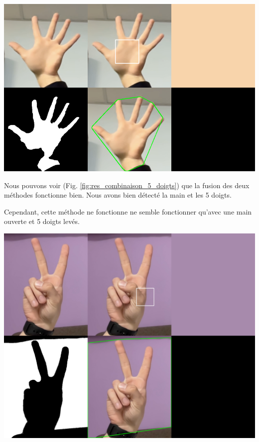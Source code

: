 \documentclass[11pt]{article}
\begin{document}
\begin{center}
    \includegraphics[width=\textwidth]{images/res_combinaison_5_doigts.png}
    \label{fig:res_combinaison_5_doigts}
\end{center}

Nous pouvons voir (Fig. \ref{fig:res_combinaison_5_doigts}) que la fusion des deux méthodes fonctionne bien. Nous avons bien détecté la main et les 5 doigts. \bigbreak

Cependant, cette méthode ne fonctionne ne semble fonctionner qu'avec une main ouverte et 5 doigts levés. \bigbreak

\begin{center}
    \includegraphics[width=\textwidth]{images/res_combinaison_2_doigts.png}
    \label{fig:res_combinaison_2_doigts}
\end{center}
\end{document}
